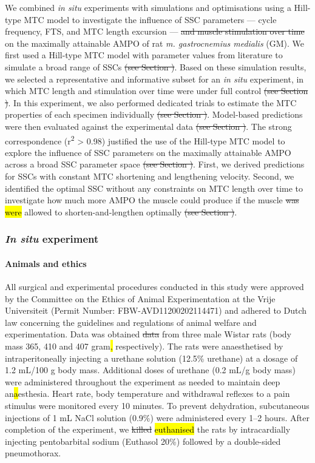 \documentclass[
  10pt,
  letterpaper,
]{article}
\begin{document}
We combined \emph{in situ} experiments with simulations and
optimisations using a Hill-type MTC model to investigate the influence
of SSC parameters --- cycle frequency, FTS, and MTC length excursion ---
\st{and muscle stimulation over time} on the maximally attainable AMPO
of rat \emph{m. gastrocnemius medialis} (GM). We first used a Hill-type
MTC model with parameter values from literature to simulate a broad
range of SSCs \st{(see Section )}. Based on these simulation results, we
selected a representative and informative subset for an \emph{in situ}
experiment, in which MTC length and stimulation over time were under
full control \st{(see Section )}. In this experiment, we also performed
dedicated trials to estimate the MTC properties of each specimen
individually \st{(see Section )}. Model-based predictions were then
evaluated against the experimental data \st{(see Section )}. The strong
correspondence (r\textsuperscript{2} \textgreater{} 0.98) justified the
use of the Hill-type MTC model to explore the influence of SSC
parameters on the maximally attainable AMPO across a broad SSC parameter
space \st{(see Section )}. First, we derived predictions for SSCs with
constant MTC shortening and lengthening velocity. Second, we identified
the optimal SSC without any constraints on MTC length over time to
investigate how much more AMPO the muscle could produce if the muscle
\st{was} \hl{were} allowed to shorten-and-lengthen optimally \st{(see
Section )}.

\subsubsection{\texorpdfstring{\emph{In situ}
experiment}{In situ experiment}}\label{in-situ-experiment}

\paragraph{Animals and ethics}\label{animals-and-ethics}

All surgical and experimental procedures conducted in this study were
approved by the Committee on the Ethics of Animal Experimentation at the
Vrije Universiteit (Permit Number: FBW-AVD11200202114471) and adhered to
Dutch law concerning the guidelines and regulations of animal welfare
and experimentation. Data was obtained \st{data} from three male Wistar
rats (body mass 365, 410 and 407 gram\hl{,} respectively). The rats were
anaesthetised by intraperitoneally injecting a urethane solution (12.5\%
urethane) at a dosage of 1.2 mL/100 g body mass. Additional doses of
urethane (0.2 mL/g body mass) were administered throughout the
experiment as needed to maintain deep an\hl{a}esthesia. Heart rate, body
temperature and withdrawal reflexes to a pain stimulus were monitored
every 10 minutes. To prevent dehydration, subcutaneous injections of 1
mL NaCl solution (0.9\%) were administered every 1--2 hours. After
completion of the experiment, we \st{killed} \hl{euthanised} the rats by
intracardially injecting pentobarbital sodium (Euthasol 20\%) followed
by a double-sided pneumothorax.
\end{document}

